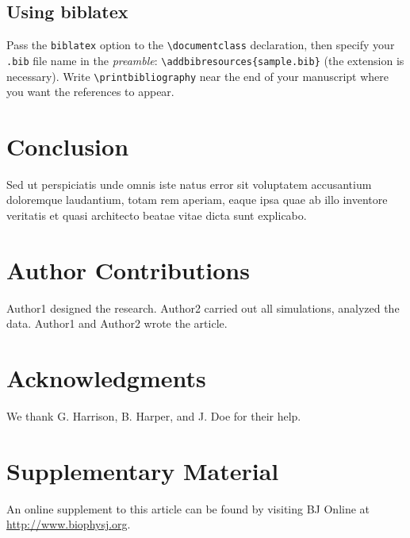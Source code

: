 \documentclass{biophys-new}
\begin{document}
\subsection*{Using biblatex} 
Pass the \texttt{biblatex} option to the \verb|\documentclass| declaration, then specify your \texttt{.bib} file name in the \emph{preamble}: \verb|\addbibresources{sample.bib}| (the extension is necessary). Write \verb|\printbibliography| near the end of your manuscript where you want the references to appear.

\section*{Conclusion}

Sed ut perspiciatis unde omnis iste natus error sit voluptatem accusantium doloremque laudantium, totam rem aperiam, eaque ipsa quae ab illo inventore veritatis et quasi architecto beatae vitae dicta sunt explicabo. 

\section*{Author Contributions}

Author1 designed the research. Author2 carried out all simulations, analyzed the data. Author1 and Author2 wrote the article. 

\section*{Acknowledgments}

We thank G. Harrison, B. Harper, and J. Doe for their help.




\section*{Supplementary Material}

An online supplement to this article can be found by visiting BJ Online at \url{http://www.biophysj.org}.
\end{document}
